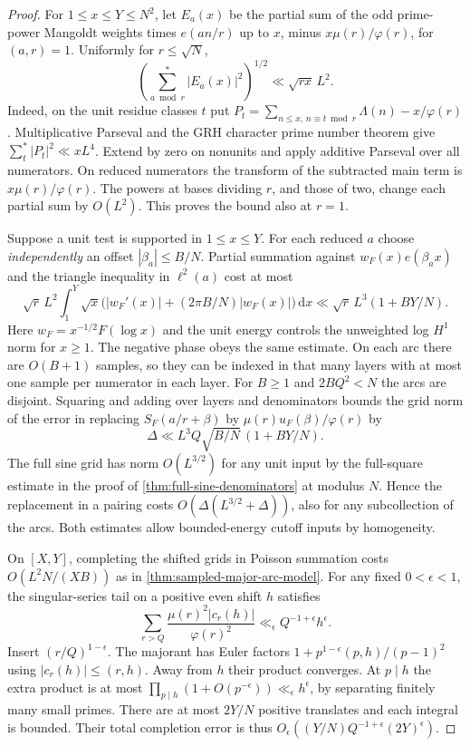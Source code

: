 \documentclass[11pt,a4paper]{article}
\numberwithin{equation}{section}
\newcommand{\ud}{\mathrm d}
\begin{document}
\begin{proof}
For $1\le x\le Y\le N^2$, let $E_a(x)$ be the partial sum of
the odd prime-power Mangoldt weights times $e(an/r)$ up to $x$,
minus $x\mu(r)/\varphi(r)$, for $(a,r)=1$. Uniformly for
$r\le\sqrt N$,
\[
 \left(\sum_{a\bmod r}^{*}|E_a(x)|^2\right)^{1/2}
       \ll \sqrt{rx}\,L^2 .
\]
Indeed, on the unit residue classes $t$ put
$P_t=\sum_{n\le x,\,n\equiv t\bmod r}\Lambda(n)-x/\varphi(r)$.
Multiplicative Parseval and the GRH character prime number
theorem give $\sum_t^* |P_t|^2\ll xL^4$. Extend by zero on
nonunits and apply additive Parseval over all numerators. On
reduced numerators the transform of the subtracted main term is
$x\mu(r)/\varphi(r)$. The powers at bases dividing $r$, and
those of two, change each partial sum by $O(L^2)$. This proves
the bound also at $r=1$.

Suppose a unit test is supported in $1\le x\le Y$. For each
reduced $a$ choose \emph{independently} an offset
$|\beta_a|\le B/N$. Partial summation against
$w_F(x)e(\beta_a x)$ and the triangle inequality in $\ell^2(a)$
cost at most
\[
 \sqrt r\,L^2
 \int_1^Y \sqrt x\bigl(|w_F'(x)|+(2\pi B/N)|w_F(x)|\bigr)\,\ud x
 \ll \sqrt r\,L^3(1+BY/N).
\]
Here $w_F=x^{-1/2}F(\log x)$ and the unit energy controls the
unweighted log $H^1$ norm for $x\ge1$. The negative phase obeys
the same estimate. On each arc there are $O(B+1)$ samples, so
they can be indexed in that many layers with at most one sample
per numerator in each layer. For $B\ge1$ and $2BQ^2<N$ the
arcs are disjoint. Squaring and adding over layers and denominators
bounds the grid norm of the error in replacing $S_F(a/r+\beta)$
by $\mu(r)u_F(\beta)/\varphi(r)$ by
\begin{equation}
 \Delta\ll L^3 Q\sqrt{B/N}\,(1+BY/N).
 \label{eq:numerator-mean-grid}
\end{equation}
The full sine grid has norm $O(L^{3/2})$ for any unit input by
the full-square estimate in the proof of
\cref{thm:full-sine-denominators} at modulus $N$. Hence the
replacement in a pairing costs $O(\Delta(L^{3/2}+\Delta))$,
also for any subcollection of the arcs. Both estimates allow
bounded-energy cutoff inputs by homogeneity.

On $[X,Y]$, completing the shifted grids in Poisson summation
costs $O(L^2N/(XB))$ as in \cref{thm:sampled-major-arc-model}.
For any fixed $0<\epsilon<1$, the singular-series tail on a
positive even shift $h$ satisfies
\[
 \sum_{r>Q}\frac{\mu(r)^2|c_r(h)|}{\varphi(r)^2}
        \ll_\epsilon Q^{-1+\epsilon}h^\epsilon .
\]
Insert $(r/Q)^{1-\epsilon}$. The majorant has Euler factors
$1+p^{1-\epsilon}(p,h)/(p-1)^2$ using $|c_r(h)|\le(r,h)$.
Away from $h$ their product converges. At $p\mid h$ the extra
product is at most $\prod_{p\mid h}(1+O(p^{-\epsilon}))
\ll_\epsilon h^\epsilon$, by separating finitely many small
primes. There are at most $2Y/N$ positive translates and each
integral is bounded. Their total completion error is thus
$O_\epsilon((Y/N)Q^{-1+\epsilon}(2Y)^\epsilon)$.


\end{proof}
\end{document}
